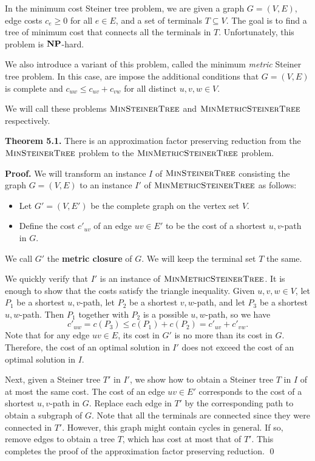 \documentclass{article}
\DeclareMathOperator{\NP}{{\bf NP}}
\DeclareMathOperator{\MinSteinerTree}{\textsc{MinSteinerTree}}
\DeclareMathOperator{\MinMetricSteinerTree}{\textsc{MinMetricSteinerTree}}
\begin{document}
In the minimum cost Steiner tree problem, we are given a graph 
$G = (V, E)$, edge costs $c_e \geq 0$ for all $e \in E$, and a set 
of terminals $T \subseteq V$. The goal is to find a tree of minimum cost 
that connects all the terminals in $T$. Unfortunately, this problem 
is $\NP$-hard. 

We also introduce a variant of this problem, called the 
minimum \emph{metric} Steiner tree problem. In this case, 
are impose the additional conditions that $G = (V, E)$ is complete and 
$c_{uw} \leq c_{uv} + c_{vw}$ for all distinct $u, v, w \in V$. 

We will call these problems $\MinSteinerTree$ and $\MinMetricSteinerTree$ respectively.

{\color{violet}
{\bf Theorem 5.1.} There is an approximation factor preserving reduction from 
the $\MinSteinerTree$ problem to the $\MinMetricSteinerTree$ problem. 
}

{\color{blue}
{\bf Proof.} We will transform an instance $I$ of $\MinSteinerTree$ consisting the 
graph $G = (V, E)$ to an instance $I'$ of $\MinMetricSteinerTree$ as follows: 
\begin{itemize}
    \item Let $G' = (V, E')$ be the complete graph on the vertex set $V$. 
    \item Define the cost $c'_{uv}$ of an edge $uv \in E'$ to be the cost 
    of a shortest $u, v$-path in $G$. 
\end{itemize}
We call $G'$ the {\bf metric closure} of $G$. We will keep the terminal 
set $T$ the same. 

We quickly verify that $I'$ is an instance of $\MinMetricSteinerTree$. 
It is enough to show that the costs satisfy the triangle inequality. 
Given $u, v, w \in V$, let $P_1$ be a shortest $u, v$-path, 
let $P_2$ be a shortest $v, w$-path, and let $P_3$ be a shortest $u, w$-path. 
Then $P_1$ together with $P_2$ is a possible $u, w$-path, so we have 
\[ c'_{uw} = c(P_3) \leq c(P_1) + c(P_2) = c'_{uv} + c'_{vw}. \] 
Note that for any edge $uv \in E$, its cost in $G'$ is no more than 
its cost in $G$. Therefore, the cost of an optimal solution in $I'$ 
does not exceed the cost of an optimal solution in $I$. 

Next, given a Steiner tree $T'$ in $I'$, we show how to obtain 
a Steiner tree $T$ in $I$ of at most the same cost. The cost of an 
edge $uv \in E'$ corresponds to the cost of a shortest $u, v$-path in $G$. 
Replace each edge in $T'$ by the corresponding path to obtain a 
subgraph of $G$. Note that all the terminals are connected since 
they were connected in $T'$. However, this graph might contain cycles 
in general. 
If so, remove edges to obtain a tree $T$, which has cost at most that of $T'$. 
This completes the proof of the approximation factor preserving reduction. \qed
}
\end{document}
